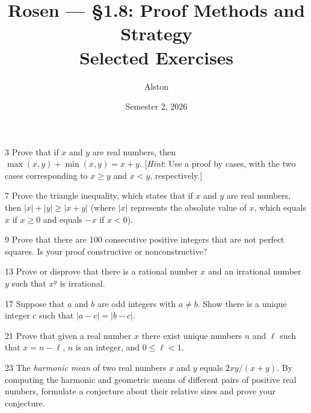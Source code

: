 \documentclass[11pt]{article}
\title{Rosen --- \S 1.8: Proof Methods and Strategy\\ \large Selected Exercises}
\author{Alston}
\date{Semester 2, 2026}
\begin{document}
\maketitle

\begin{exercise}{3}
    Prove that if $x$ and $y$ are real numbers, then
    $\max(x,y) + \min(x,y) = x + y$.
    [\emph{Hint}: Use a proof by cases, with the two cases corresponding
    to $x \geq y$ and $x < y$, respectively.]
\end{exercise}

\begin{exercise}{7}
    Prove the triangle inequality, which states that if $x$ and $y$ are
    real numbers, then $|x| + |y| \geq |x + y|$ (where $|x|$ represents
    the absolute value of $x$, which equals $x$ if $x \geq 0$ and equals
    $-x$ if $x < 0$).
\end{exercise}

\begin{exercise}{9}
    Prove that there are 100 consecutive positive integers that are not
    perfect squares. Is your proof constructive or nonconstructive?
\end{exercise}

\begin{exercise}{13}
    Prove or disprove that there is a rational number $x$ and an
    irrational number $y$ such that $x^y$ is irrational.
\end{exercise}

\begin{exercise}{17}
    Suppose that $a$ and $b$ are odd integers with $a \neq b$. Show
    there is a unique integer $c$ such that $|a - c| = |b - c|$.
\end{exercise}

\begin{exercise}{21}
    Prove that given a real number $x$ there exist unique numbers $n$
    and $\ell$ such that $x = n - \ell$, $n$ is an integer, and
    $0 \leq \ell < 1$.
\end{exercise}

\begin{exercise}{23}
    The \emph{harmonic mean} of two real numbers $x$ and $y$ equals
    $2xy/(x+y)$. By computing the harmonic and geometric means of
    different pairs of positive real numbers, formulate a conjecture
    about their relative sizes and prove your conjecture.
\end{exercise}
\end{document}
